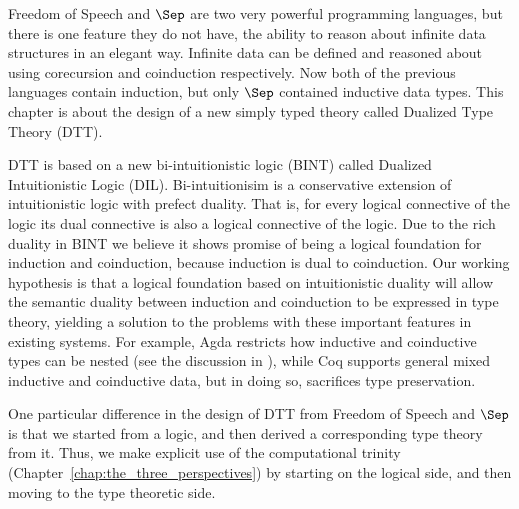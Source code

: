 \newcommand{\redtoby}[1]{\stackrel{ \ifrName{({\tiny #1})}}{\redto}}



\newcommand{\ifrName}[1]{\textsc{#1}}

\newcommand{\ndto}[1]{\to_{#1}}
\newcommand{\ndwedge}[1]{\wedge_{#1}}

\newcommand{\To}[0]{\Rightarrow}
\newcommand{\SN}[0]{\mathbf{SN}} 

Freedom of Speech and $\Sep$ are two very powerful programming
languages, but there is one feature they do not have, the ability to
reason about infinite data structures in an elegant way.  Infinite
data can be defined and reasoned about using corecursion and
coinduction respectively.  Now both of the previous languages contain
induction, but only $\Sep$ contained inductive data types.  This
chapter is about the design of a new simply typed theory called
Dualized Type Theory (DTT).

DTT is based on a new bi-intuitionistic logic (BINT) called Dualized
Intuitionistic Logic (DIL).  Bi-intuitionisim is a conservative
extension of intuitionistic logic with prefect duality.  That is, for
every logical connective of the logic its dual connective is also a
logical connective of the logic.  Due to the rich duality in BINT we
believe it shows promise of being a logical foundation for induction
and coinduction, because induction is dual to coinduction. Our working
hypothesis is that a logical foundation based on intuitionistic
duality will allow the semantic duality between induction and
coinduction to be expressed in type theory, yielding a solution to the
problems with these important features in existing systems.  For
example, Agda restricts how inductive and coinductive types can be
nested (see the discussion in \cite{abel+13}), while Coq supports
general mixed inductive and coinductive data, but in doing so,
sacrifices type preservation.

One particular difference in the design of DTT from Freedom of Speech
and $\Sep$ is that we started from a logic, and then derived a
corresponding type theory from it.  Thus, we make explicit use of the
computational trinity (Chapter~\ref{chap:the_three_perspectives}) by
starting on the logical side, and then moving to the type theoretic
side.

